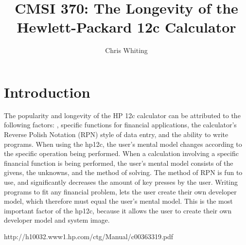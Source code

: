 \documentclass{article}
\title{CMSI 370: The Longevity of the Hewlett-Packard 12c Calculator}
\author{Chris Whiting}
\date{}
\begin{document}
\maketitle


\pagebreak
\tableofcontents

\pagebreak

%
%
\section{Introduction}
\label{introduction}

The popularity and longevity of the HP 12c calculator can be attributed to the following factors: , specific functions for financial applications, the calculator's Reverse Polish Notation (RPN) style of data entry, and the ability to write programs. When using the hp12c, the user's mental model changes according to the specific operation being performed. When a calculation involving a specific financial function is being performed, the user's mental model consists of the givens, the unknowns, and the method of solving. The method of RPN is fun to use, and significantly decreases the amount of key presses by the user. Writing programs to fit any financial problem, lets the user create their own developer model, which therefore must equal the user's mental model. This is the most important factor of the hp12c, because it allows the user to create their own developer model and system image.

http://h10032.www1.hp.com/ctg/Manual/c00363319.pdf
\end{document}
